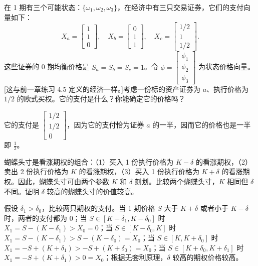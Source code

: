 \begin{problem}
 在 1 期有三个可能状态：$\{\omega_{1},\omega_{2},\omega_{3}\}$，在经济中有三只交易证券，它们的支付向量如下：
\[
    X_{a}=\begin{bmatrix}1\\1\\0\end{bmatrix},\quad
    X_{b}=\begin{bmatrix}0\\1\\1\end{bmatrix},\quad
    X_{c}=\begin{bmatrix}1/2\\1\\1/2\end{bmatrix}.
\]
这些证券的 0 期均衡价格是 $S_{a}=S_{b}=S_{c}=1$。令 $\phi=\begin{bmatrix}\phi_{1} \\ \phi_{2} \\ \phi_{3}\end{bmatrix}$ 为状态价格向量。[这与前一章练习 4.5 定义的经济一样。]考虑一份标的资产证券为 $a$、执行价格为 $1/2$ 的欧式买权。它的支付是什么？你能确定它的价格吗？
\end{problem}
\begin{solution}
它的支付是 $\begin{bmatrix}1/2\\1/2\\0\end{bmatrix}$，因为它的支付恰为证券 $a$ 的一半，因而它的价格也是一半即 $\tfrac12$。
\end{solution}

\begin{problem}
 蝴蝶头寸是看涨期权的组合：（1）买入 1 份执行价格为 $K-\delta$ 的看涨期权，（2）卖出 2 份执行价格为 $K$ 的看涨期权，（3）买入 1 份执行价格为 $K+\delta$ 的看涨期权。因此，蝴蝶头寸可由两个参数 $K$ 和 $\delta$ 刻划。比较两个蝴蝶头寸，$K$ 相同但 $\delta$ 不同。证明 $\delta$ 较高的蝴蝶头寸的价值较高。
\end{problem}
\begin{solution}
假设 $\delta_{1}>\delta_{0}$，比较两只期权的支付。当 1 期价格 $S$ 大于 $K+\delta$ 或者小于 $K-\delta$ 时，两者的支付都为 0；当 $S\in[K-\delta_{1},K-\delta_{0}]$ 时 $X_{1}=S-(K-\delta_{1})>X_{0}=0$；当 $S\in[K-\delta_{0},K]$ 时 $X_{1}=S-(K-\delta_{1})>S-(K-\delta_{0})=X_{0}$；当 $S\in[K,K+\delta_{0}]$ 时 $X_{1}=-S+(K+\delta_{1})>-S+(K+\delta_{0})=X_{0}$；当 $S\in[K+\delta_{0},K+\delta_{1}]$ 时 $X_{1}=-S+(K+\delta_{1})>0=X_{0}$；根据无套利原理，$\delta$ 较高的期权价格较高。
\end{solution}


